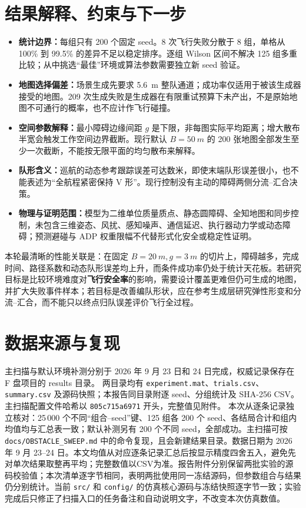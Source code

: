 \documentclass[UTF8,a4paper,11pt,fontset=windows]{ctexart}
\newcommand{\code}[1]{\texttt{#1}}
\begin{document}
\section{结果解释、约束与下一步}
\begin{itemize}
\item \textbf{统计边界：}每组只有 200 个固定 seed。8 次飞行失败分散于 8 组，单格从 100\% 到 99.5\% 的差异不足以稳定排序。逐组 Wilson 区间不解决 125 组多重比较；从中挑选“最佳”环境或算法参数需要独立新 seed 验证。
\item \textbf{地图选择偏差：}场景生成先要求 \SI{5.6}{m} 整队通道；成功率仅适用于被该生成器接受的地图。209 次生成失败是生成器在有限重试预算下未产出，不是原始地图不可通行的概率，也不应计作飞行碰撞。
\item \textbf{空间参数解释：}最小障碍边缘间距 $g$ 是下限，非每图实际平均距离；增大散布半宽会触发工作空间边界截断。现行默认 $B=\SI{50}{m}$ 的 200 张地图全部发生至少一次截断，不能按无限平面的均匀散布来解释。
\item \textbf{队形含义：}巡航的动态参考跟踪误差可达数米，即使末端队形误差很小，也不能表述为“全航程紧密保持 V 形”。现行控制没有主动的障碍两侧分流--汇合决策。
\item \textbf{物理与证明范围：}模型为二维单位质量质点、静态圆障碍、全知地图和同步控制，未包含三维姿态、风扰、感知噪声、通信延迟、执行器动力学或动态障碍；预测避碰与 ADP 权重限幅不代替形式化安全或稳定性证明。
\end{itemize}
本轮最清晰的性能关联是：在固定 $B=\SI{20}{m},g=\SI{3}{m}$ 的切片上，障碍越多，完成时间、路径系数和动态队形误差均上升，而条件成功率仍处于统计天花板。若研究目标是比较环境难度对\textbf{飞行安全率}的影响，需要设计覆盖更难但仍可生成的地图，并扩大失败事件样本；若目标是改善编队形状，应在参考生成层研究弹性形变和分流--汇合，而不能只以终点归队误差评价飞行全过程。

\appendix
\section{数据来源与复现}
主扫描与默认环境补测分别于 2026 年 9 月 23 日和 24 日完成，权威记录保存在 F 盘项目的 results 目录。
两目录均有 \code{experiment.mat}、\code{trials.csv}、\code{summary.csv}
及源码快照；本报告同目录附逐 seed、分组统计及 SHA-256 CSV。
主扫描配置文件哈希以 \code{805c715a6971} 开头，完整值见附件。
本次从逐条记录独立核对：25\,000 个不同“组合--seed”键、125 组各
200 个 seed、各结局合计和组内均值均与汇总表一致；默认补测另有
200 个不同 seed，全部成功。主扫描可按 \code{docs/OBSTACLE\_SWEEP.md} 中的命令复现，且会新建结果目录。数据日期为 2026 年 9 月 23--24 日。本文均值从对应逐条记录汇总后按显示精度四舍五入，避免先对单次结果取整再平均；完整数值以CSV为准。报告附件分别保留两批实验的源码校验值；本次清单逐字节相同，表明两批使用同一冻结源码，但参数组合与结果仍分别统计。当前 \code{src/} 和 \code{config/} 的仿真核心源码与冻结快照逐字节一致；实验完成后只修正了扫描入口的任务备注和自动说明文字，不改变本次仿真数值。
\end{document}
